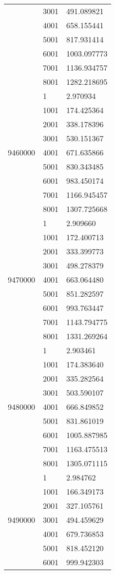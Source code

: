 \begin{table}[htb!]
\begin{tabular}{lll}
 & 3001 & 491.089821 \\
 & 4001 & 658.155441 \\
 & 5001 & 817.931414 \\
 & 6001 & 1003.097773 \\
 & 7001 & 1136.934757 \\
 & 8001 & 1282.218695 \\
\multirow[c]{9}{*}{9460000} & 1 & 2.970934 \\
 & 1001 & 174.425364 \\
 & 2001 & 338.178396 \\
 & 3001 & 530.151367 \\
 & 4001 & 671.635866 \\
 & 5001 & 830.343485 \\
 & 6001 & 983.450174 \\
 & 7001 & 1166.945457 \\
 & 8001 & 1307.725668 \\
\multirow[c]{9}{*}{9470000} & 1 & 2.909660 \\
 & 1001 & 172.400713 \\
 & 2001 & 333.399773 \\
 & 3001 & 498.278379 \\
 & 4001 & 663.064480 \\
 & 5001 & 851.282597 \\
 & 6001 & 993.763447 \\
 & 7001 & 1143.794775 \\
 & 8001 & 1331.269264 \\
\multirow[c]{9}{*}{9480000} & 1 & 2.903461 \\
 & 1001 & 174.383640 \\
 & 2001 & 335.282564 \\
 & 3001 & 503.590107 \\
 & 4001 & 666.849852 \\
 & 5001 & 831.861019 \\
 & 6001 & 1005.887985 \\
 & 7001 & 1163.475513 \\
 & 8001 & 1305.071115 \\
\multirow[c]{9}{*}{9490000} & 1 & 2.984762 \\
 & 1001 & 166.349173 \\
 & 2001 & 327.105761 \\
 & 3001 & 494.459629 \\
 & 4001 & 679.736853 \\
 & 5001 & 818.452120 \\
 & 6001 & 999.942303 \\

\end{tabular}
\end{table}
